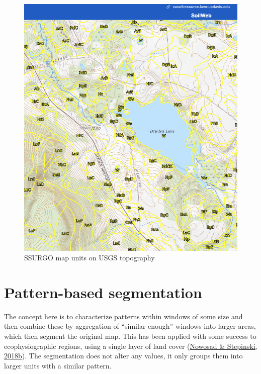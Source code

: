 \documentclass[
  letterpaper,
  DIV=11,
  numbers=noendperiod]{scrartcl}
\begin{document}
\begin{figure}

{\centering \includegraphics{./figs/SoilWebDrydenLakeTopo.png}

}

\caption{\label{fig-dryden-topo}SSURGO map units on USGS topography}

\end{figure}

\hypertarget{pattern-based-segmentation}{%
\section{Pattern-based segmentation}\label{pattern-based-segmentation}}

The concept here is to characterize patterns within windows of some size
and then combine these by aggregation of ``similar enough'' windows into
larger areas, which then segment the original map. This has been applied
with some success to ecophysiographic regions, using a single layer of
land cover
(\protect\hyperlink{ref-nowosadMachineEcoregionalizationEarth2018}{Nowosad
\& Stepinski, 2018b}). The segmentation does not alter any values, it
only groups them into larger units with a similar pattern.
\end{document}
